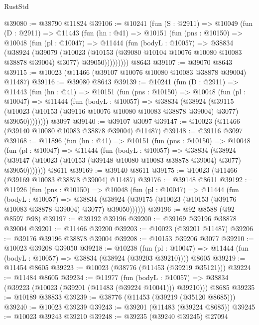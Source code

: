 \begin{lexlean}{RustStd}
\begin{coremodule}
@39080 := @38790 @11824
@39106 := @10241
    (fun (S : @2911) =>
    @10049
      (fun (D : @2911) =>
      @11443
        (fun (hn : @41) =>
        @10151
          (fun (pns : @10150) =>
          @10048
            (fun (pl : @10047) =>
            @11444
              (fun (bodyL : @10057) =>
              @38834
                (@38924
                  (@39079
                    (@10023
                      (@10153 (@39080 @10104 @10076 @10080 @10083 @38878 @39004) @3077)
                      @39050)))))))))
    @8643
@39107 := @39070 @8643
@39115 := @10023 (@11466 (@39107 @10076 @10080 @10083 @38878 @39004) @11487)
@39116 := @39080 @8643
@39139 := @10241
    (fun (D : @2911) =>
    @11443
      (fun (hn : @41) =>
      @10151
        (fun (pns : @10150) =>
        @10048
          (fun (pl : @10047) =>
          @11444
            (fun (bodyL : @10057) =>
            @38834
              (@38924
                (@39115
                  (@10023 (@10153 (@39116 @10076 @10080 @10083 @38878 @39004) @3077) @39050))))))))
    @3097
@39140 := @39107 @3097
@39147 := @10023 (@11466 (@39140 @10080 @10083 @38878 @39004) @11487)
@39148 := @39116 @3097
@39168 := @11896
    (fun (hn : @41) =>
    @10151
      (fun (pns : @10150) =>
      @10048
        (fun (pl : @10047) =>
        @11444
          (fun (bodyL : @10057) =>
          @38834
            (@38924
              (@39147 (@10023 (@10153 (@39148 @10080 @10083 @38878 @39004) @3077) @39050)))))))
    @8611
@39169 := @39140 @8611
@39175 := @10023 (@11466 (@39169 @10083 @38878 @39004) @11487)
@39176 := @39148 @8611
@39192 := @11926
    (fun (pns : @10150) =>
    @10048
      (fun (pl : @10047) =>
      @11444
        (fun (bodyL : @10057) =>
        @38834 (@38924 (@39175 (@10023 (@10153 (@39176 @10083 @38878 @39004) @3077) @39050))))))
@39196 := @92 @8588 (@92 @8597 @98)
@39197 := @39192 @39196
@39200 := @39169 @39196 @38878 @39004
@39201 := @11466 @39200
@39203 := @10023 (@39201 @11487)
@39206 := @39176 @39196 @38878 @39004
@39208 := @10153 @39206 @3077
@39210 := @10023 @39208 @39050
@39218 := @10238
    (fun (pl : @10047) => @11444 (fun (bodyL : @10057) => @38834 (@38924 (@39203 @39210))))
    @8605
@39219 := @11454 @8605
@39223 := @10023 (@38776 (@11453 (@39219 @35121)))
@39224 := @11484 @8605
@39234 := @11977
    (fun (bodyL : @10057) => @38834 (@39223 (@10023 (@39201 (@11483 (@39224 @10041))) @39210)))
    @8685
@39235 := @10189 @38833
@39239 := @38776 (@11453 (@39219 (@35120 @8685)))
@39240 := @10023 @39239
@39243 := @39201 (@11483 (@39224 @8685))
@39245 := @10023 @39243 @39210
@39248 := @39235 (@39240 @39245) @27094

\end{coremodule}
\end{lexlean}
